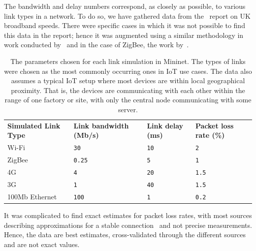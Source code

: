 The bandwidth and delay numbers correspond, as closely as possible, to various link types in a network.
To do so, we have gathered data from the~\cite{ofcom_uk_2021} report on UK broadband speeds.
There were specific cases in which it was not possible to find this data in the report; hence it was augmented using a similar methodology in work conducted by~\cite{previdi_is-is_2019} and in the case of ZigBee, the work by~\citet{alena_fault_2011}.

\begin{table}[ht]
    \caption{The parameters chosen for each link simulation in Mininet. The types of links were chosen as the most commonly occurring ones in IoT use cases. The data also assumes a typical IoT setup where most devices are within local geographical proximity. That is, the devices are communicating with each other within the range of one factory or site, with only the central node communicating with some server.}\label{tab:links}
    \begin{tabular}{@{}llll@{}}
        \toprule
        \textbf{Simulated Link Type} & \textbf{Link bandwidth (Mb/s)} & \textbf{Link delay (ms)} & \textbf{Packet loss rate (\%)} \\
        Wi-Fi                        & \texttt{30}                    & \texttt{10}              & \texttt{2}                     \\
        ZigBee                       & \texttt{0.25}                  & \texttt{5}               & \texttt{1}                     \\
        4G                           & \texttt{4}                     & \texttt{20}              & \texttt{1.5}                   \\
        3G                           & \texttt{1}                     & \texttt{40}              & \texttt{1.5}                   \\
        100Mb Ethernet               & \texttt{100}                   & \texttt{1}               & \texttt{0.2}                   \\
        \bottomrule
    \end{tabular}
\end{table}

It was complicated to find exact estimates for packet loss rates, with most sources describing approximations for a stable connection~\citep{sdu_ictp-sdu_2013} and not precise measurements.
Hence, the data are best estimates, cross-validated through the different sources and are not exact values.

